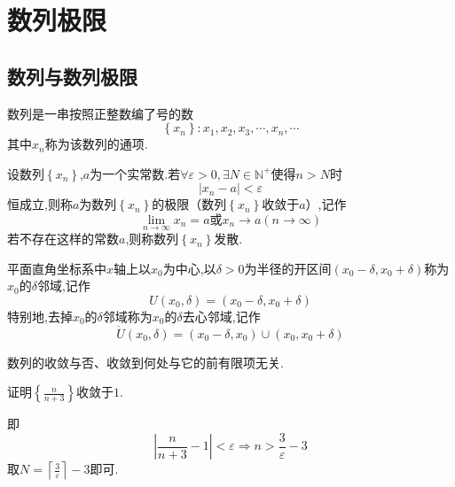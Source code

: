 \section{数列极限}
\subsection{数列与数列极限}
\begin{formal}
    \begin{definition}[数列的定义]\label{def:数列的定义}
        数列是一串按照正整数编了号的数\[
        \left\{x_n\right\}:x_1,x_2,x_3,\cdots,x_n,\cdots
        \]其中$x_n$称为该数列的通项.
    \end{definition}
\end{formal}
\begin{formal}
    \begin{definition}[数列极限的定义]\label{def:数列极限的定义}
        设数列$\left\{x_n\right\}$,$a$为一个实常数.若$\forall \varepsilon >0,\exists N\in\mathbb{N}^+$使得$n>N$时\[
        \left|
            x_n-a
        \right|<\varepsilon
        \]恒成立,则称$a$为数列$\left\{x_n\right\}$的极限（数列$\left\{x_n\right\}$收敛于$a$）,记作\[
        \lim_{n\to\infty}x_n=a\text{或}x_n\to a\left(n\to\infty\right)
        \]若不存在这样的常数$a$,则称数列$\left\{x_n\right\}$发散.
    \end{definition}
\end{formal}
\begin{formal}
    \begin{definition}[邻域的概念]\label{def:邻域的概念}
        平面直角坐标系中$x$轴上以$x_0$为中心,以$\delta>0$为半径的开区间$\left(
            x_0-\delta,x_0+\delta
        \right)$称为$x_0$的$\delta$邻域,记作\[
        U\left(x_0,\delta\right)=\left(
            x_0-\delta,x_0+\delta
        \right)
        \]特别地,去掉$x_0$的$\delta$邻域称为$x_0$的$\delta$去心邻域,记作\[
        \mathring{U}\left(x_0,\delta\right)=\left(
            x_0-\delta,x_0\right)\cup\left(
                x_0,x_0+\delta
            \right)
        \]
    \end{definition}
\end{formal}
\begin{red}
    \begin{remark}
        数列的收敛与否、收敛到何处与它的前有限项无关.
    \end{remark}
\end{red}
\begin{brown}
    \begin{example}
        证明$\displaystyle \left\{
            \frac{n}{n+3}
        \right\}$收敛于$1$.
    \end{example}
    \begin{Proof}
        即\[
        \left|
            \frac{n}{n+3}-1
        \right|<\varepsilon\Longrightarrow n>\frac{3}{\varepsilon}-3
        \]取$N=\left\lceil\displaystyle\frac{3}{\varepsilon} \right\rceil -3$即可.
    \end{Proof}
\end{brown}
